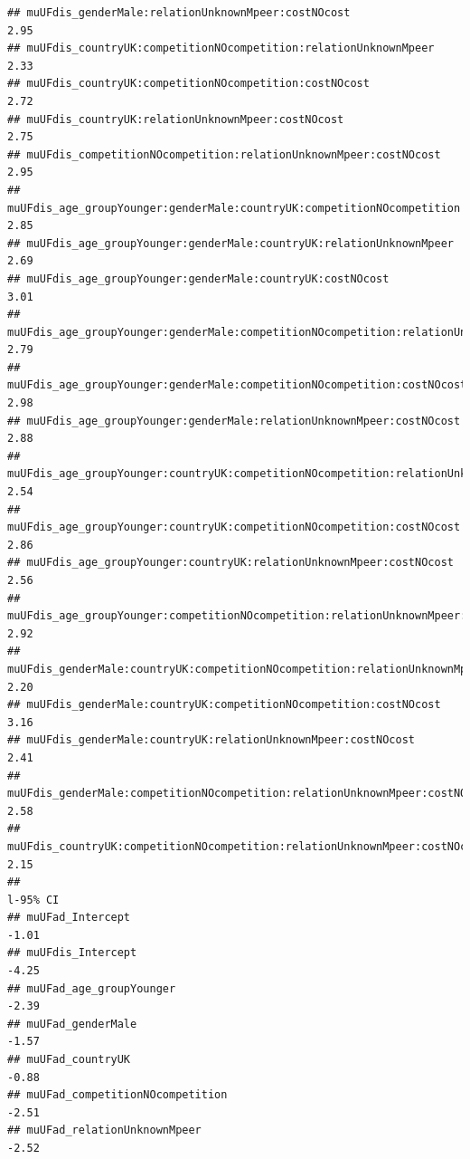 \documentclass[
]{article}
\begin{document}
\begin{verbatim}
## muUFdis_genderMale:relationUnknownMpeer:costNOcost                                     2.95
## muUFdis_countryUK:competitionNOcompetition:relationUnknownMpeer                        2.33
## muUFdis_countryUK:competitionNOcompetition:costNOcost                                  2.72
## muUFdis_countryUK:relationUnknownMpeer:costNOcost                                      2.75
## muUFdis_competitionNOcompetition:relationUnknownMpeer:costNOcost                       2.95
## muUFdis_age_groupYounger:genderMale:countryUK:competitionNOcompetition                 2.85
## muUFdis_age_groupYounger:genderMale:countryUK:relationUnknownMpeer                     2.69
## muUFdis_age_groupYounger:genderMale:countryUK:costNOcost                               3.01
## muUFdis_age_groupYounger:genderMale:competitionNOcompetition:relationUnknownMpeer      2.79
## muUFdis_age_groupYounger:genderMale:competitionNOcompetition:costNOcost                2.98
## muUFdis_age_groupYounger:genderMale:relationUnknownMpeer:costNOcost                    2.88
## muUFdis_age_groupYounger:countryUK:competitionNOcompetition:relationUnknownMpeer       2.54
## muUFdis_age_groupYounger:countryUK:competitionNOcompetition:costNOcost                 2.86
## muUFdis_age_groupYounger:countryUK:relationUnknownMpeer:costNOcost                     2.56
## muUFdis_age_groupYounger:competitionNOcompetition:relationUnknownMpeer:costNOcost      2.92
## muUFdis_genderMale:countryUK:competitionNOcompetition:relationUnknownMpeer             2.20
## muUFdis_genderMale:countryUK:competitionNOcompetition:costNOcost                       3.16
## muUFdis_genderMale:countryUK:relationUnknownMpeer:costNOcost                           2.41
## muUFdis_genderMale:competitionNOcompetition:relationUnknownMpeer:costNOcost            2.58
## muUFdis_countryUK:competitionNOcompetition:relationUnknownMpeer:costNOcost             2.15
##                                                                                   l-95% CI
## muUFad_Intercept                                                                     -1.01
## muUFdis_Intercept                                                                    -4.25
## muUFad_age_groupYounger                                                              -2.39
## muUFad_genderMale                                                                    -1.57
## muUFad_countryUK                                                                     -0.88
## muUFad_competitionNOcompetition                                                      -2.51
## muUFad_relationUnknownMpeer                                                          -2.52

\end{verbatim}
\end{document}
